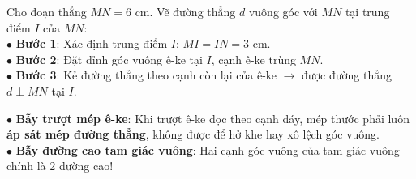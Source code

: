 \documentclass[14pt,a4paper,oneside]{extbook}
\begin{document}
\vspace{2mm}

\noindent
\begin{minipage}[t]{0.53\textwidth}
  \begin{tcolorbox}[
    enhanced,
    title={\footnotesize\bfseries\color{white}\faCheckCircle\ Ví dụ thực hành chuẩn mực},
    colback=green!2!white,
    colframe=green!60!black,
    arc=2.5mm, boxrule=0.8pt, top=1.8mm, bottom=1.8mm, left=2.2mm, right=2.2mm
  ]
    \footnotesize
    Cho đoạn thẳng $MN = 6\text{ cm}$. Vẽ đường thẳng $d$ vuông góc với $MN$ tại trung điểm $I$ của $MN$:\\
    $\bullet$ \textbf{Bước 1}: Xác định trung điểm $I$: $MI = IN = 3\text{ cm}$.\\
    $\bullet$ \textbf{Bước 2}: Đặt đỉnh góc vuông ê-ke tại $I$, cạnh ê-ke trùng $MN$.\\
    $\bullet$ \textbf{Bước 3}: Kẻ đường thẳng theo cạnh còn lại của ê-ke $\rightarrow$ được đường thẳng $d \perp MN$ tại $I$.
  \end{tcolorbox}
\end{minipage}%
\hfill
\begin{minipage}[t]{0.45\textwidth}
  \begin{tcolorbox}[
    enhanced,
    title={\footnotesize\bfseries\color{white}\faExclamationTriangle\ Mẹo tránh bẫy trắc nghiệm},
    colback=red!2!white,
    colframe=red!70!black,
    arc=2.5mm, boxrule=0.8pt, top=1.8mm, bottom=1.8mm, left=2.2mm, right=2.2mm
  ]
    \footnotesize
    $\bullet$ \textbf{Bẫy trượt mép ê-ke}: Khi trượt ê-ke dọc theo cạnh đáy, mép thước phải luôn \textbf{áp sát mép đường thẳng}, không được để hở khe hay xô lệch góc vuông.\\
    $\bullet$ \textbf{Bẫy đường cao tam giác vuông}: Hai cạnh góc vuông của tam giác vuông chính là 2 đường cao!
  \end{tcolorbox}
\end{minipage}
\end{document}
